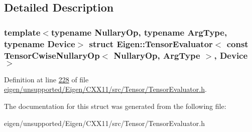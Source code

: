 \subsection{Detailed Description}
\subsubsection*{template$<$typename Nullary\+Op, typename Arg\+Type, typename Device$>$\newline
struct Eigen\+::\+Tensor\+Evaluator$<$ const Tensor\+Cwise\+Nullary\+Op$<$ Nullary\+Op, Arg\+Type $>$, Device $>$}



Definition at line \hyperlink{eigen_2unsupported_2_eigen_2_c_x_x11_2src_2_tensor_2_tensor_evaluator_8h_source_l00228}{228} of file \hyperlink{eigen_2unsupported_2_eigen_2_c_x_x11_2src_2_tensor_2_tensor_evaluator_8h_source}{eigen/unsupported/\+Eigen/\+C\+X\+X11/src/\+Tensor/\+Tensor\+Evaluator.\+h}.



The documentation for this struct was generated from the following file\+:\begin{DoxyCompactItemize}
\item 
eigen/unsupported/\+Eigen/\+C\+X\+X11/src/\+Tensor/\+Tensor\+Evaluator.\+h\end{DoxyCompactItemize}
